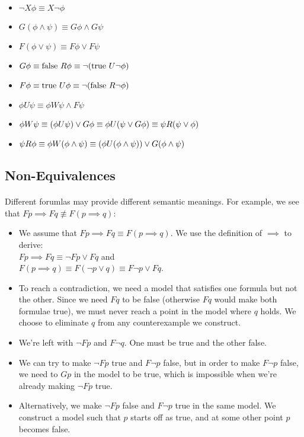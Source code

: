 \documentclass{article}
\theoremstyle{plain}
\theoremstyle{definition}
\begin{document}
\begin{multicols}{2}
\begin{itemize}
\item $\lnot X\phi \equiv X \lnot\phi$
\item $G(\phi \land \psi) \equiv G\phi \land G\psi$
\item $F(\phi \lor \psi) \equiv F\phi \lor F\psi$
\item $G\phi \equiv \text{false}\ R \phi\\ \equiv \lnot (\text{true}\ U \lnot\phi)$
\item $F\phi \equiv \text{true}\ U \phi\\ \equiv \lnot (\text{false}\ R \lnot\phi)$
\item $\phi U \psi \equiv \phi W \psi \land F\psi$
\item $\phi W \psi \equiv (\phi U \psi) \lor G\phi\\
 \equiv \phi U (\psi \lor G\phi)\\
 \equiv \psi R (\psi \lor \phi)$
\item $\psi R \phi \equiv \phi W (\phi \land \psi)\\
 \equiv (\phi U (\phi \land \psi)) \lor G(\phi \land \psi)$
\end{itemize}

\subsection{Non-Equivalences}

\paragraph{} Different forumlas may provide different semantic meanings. For example, we see that $Fp \implies Fq \not\equiv F(p \implies q)$:

\begin{itemize}
\item[] We assume that $Fp \implies Fq \equiv F(p \implies q)$. We use the definition of $\implies$ to derive:\\ $Fp \implies Fq \equiv \lnot Fp \lor Fq$ and\\ $F(p \implies q) \equiv F(\lnot p \lor q) \equiv F\lnot p \lor Fq$.
\item[] To reach a contradiction, we need a model that satisfies one formula but not the other. Since we need $Fq$ to be false (otherwise $Fq$ would make both formulae true), we must never reach a point in the model where $q$ holds. We choose to eliminate $q$ from any counterexample we construct.
\item[] We're left with $\lnot Fp$ and $F\lnot q$. One must be true and the other false.
\item[] We can try to make $\lnot Fp$ true and $F\lnot p$ false, but in order to make $F\lnot p$ false, we need to $Gp$ in the model to be true, which is impossible when we're already making $\lnot Fp$ true.
\item[] Alternatively, we make $\lnot Fp$ false and $F\lnot p$ true in the same model. We construct a model such that $p$ starts off as true, and at some other point $p$ becomes false. 
\end{itemize}


\end{multicols}
\end{document}
